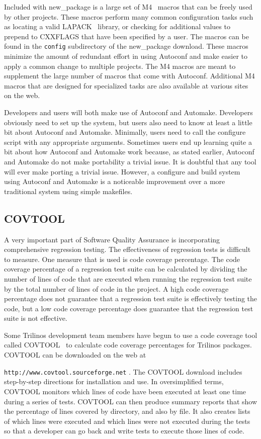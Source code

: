 \documentclass[12pt,relax]{article}
\newcommand{\InlineDirectory}[1]{
  {\hspace{0.01 in}} {\tt #1} {\hspace{0.01 in}}}
\begin{document}
Included with new\_package is a large set of M4~\cite{M4} macros that can 
be freely used by other projects.  These macros perform many common 
configuration tasks such as locating a valid LAPACK~\cite{lapack} library, 
or checking for additional values to prepend to CXXFLAGS that have been 
specified by a user.  The macros can be found in the \InlineDirectory{config}
subdirectory of the new\_package download.  These macros minimize the amount of
redundant effort in using Autoconf and make easier to apply a common change to 
multiple projects.  The M4 macros are meant to supplement the large number of 
macros that come with Autoconf.  Additional M4 macros that are designed for 
specialized tasks are also available at various sites on the web.

Developers and users will both make use of Autoconf and Automake.  Developers 
obviously need to set up the system, but users also need to know at least a 
little bit about Autoconf and Automake.  Minimally, users need to call the 
configure script with any appropriate arguments.  Sometimes users end up 
learning quite a bit about how Autoconf and Automake work because, as stated 
earlier, Autoconf and Automake do not make portability a trivial issue.  It is 
doubtful that any tool will ever make porting a trivial issue.  However, a 
configure and build system using Autoconf and Automake is a 
noticeable improvement over a more traditional system using simple makefiles.

\subsection{COVTOOL}

A very important part of Software Quality Assurance is incorporating 
comprehensive regression testing.  The effectiveness of regression tests is 
difficult to measure.  One measure that is used is code coverage percentage.  
The code coverage percentage of a regression test suite can be calculated by 
dividing the number of lines of code that are executed when running the 
regression test suite by the total number of lines of code in the project.
A high code coverage percentage does not guarantee that a regression test 
suite is effectively testing the code, but a low code coverage percentage does 
guarantee that the regression test suite is not effective.

Some Trilinos development team members have begun to use a code coverage tool 
called COVTOOL~\cite{COVTOOL} to calculate code coverage percentages for 
Trilinos packages.  COVTOOL can be downloaded on the web at 
\InlineDirectory{http://www.covtool.sourceforge.net}.  The COVTOOL download 
includes step-by-step directions for installation and use.  In oversimplified
terms, COVTOOL monitors which lines of code have been executed at least one 
time during a series of tests.  COVTOOL can then produce summary reports that 
show the percentage of lines covered by directory, and also by file.  It also 
creates lists of which lines were executed and which lines were not executed 
during the tests so that a developer can go back and write tests to execute 
those lines of code.
\end{document}

